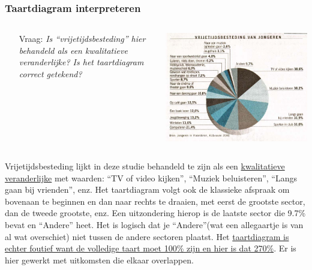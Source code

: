 \documentclass[dutch]{beamer}
\newcommand{\vraag}[1]{\begin{itemize}\item[Vraag:] {\it #1}\end{itemize}}
\begin{document}
\begin{frame}
\frametitle{Taartdiagram interpreteren}
\begin{columns}
\begin{column}{0.6\textwidth}
\vraag{Is “vrijetijdsbesteding” hier behandeld als een kwalitatieve veranderlijke? Is het taartdiagram correct getekend?}
\end{column}
\begin{column}{0.4\textwidth}
  \includegraphics[width=\textwidth]{cirkeldiagram-vrijetijdsbesteding}
\end{column}
\end{columns}
\pause
Vrijetijdsbesteding lijkt in deze studie behandeld te zijn als een \uline{kwalitatieve veranderlijke} met waarden: “TV of video kijken”, “Muziek beluisteren”, “Langs gaan bij vrienden”, enz. Het taartdiagram volgt ook de klassieke afspraak om bovenaan te beginnen en dan naar rechts te draaien, met eerst de grootste sector, dan de tweede grootste, enz. Een uitzondering hierop is de laatste sector die 9.7\% bevat en “Andere” heet. Het is logisch dat je “Andere”(wat een allegaartje is van al wat overschiet) niet tussen de andere sectoren plaatst. Het \uline{taartdiagram is echter foutief want de volledige taart moet 100\% zijn en hier is dat 270\%}. Er is hier gewerkt met uitkomsten die elkaar overlappen.
\end{frame}
\end{document}
